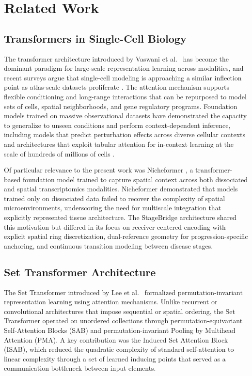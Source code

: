 \section{Related Work}

\subsection{Transformers in Single-Cell Biology}

The transformer architecture introduced by Vaswani et al.\ \cite{Vaswani2017-rb} has become the dominant paradigm for large-scale representation learning across modalities, and recent surveys argue that single-cell modeling is approaching a similar inflection point as atlas-scale datasets proliferate \cite{Szalata2024-jl}. The attention mechanism supports flexible conditioning and long-range interactions that can be repurposed to model sets of cells, spatial neighborhoods, and gene regulatory programs. Foundation models trained on massive observational datasets have demonstrated the capacity to generalize to unseen conditions and perform context-dependent inference, including models that predict perturbation effects across diverse cellular contexts \cite{Adduri2025-nt} and architectures that exploit tabular attention for in-context learning at the scale of hundreds of millions of cells \cite{Dong2026-fb}.

Of particular relevance to the present work was Nicheformer \cite{Tejada-Lapuerta2025-wz}, a transformer-based foundation model trained to capture spatial context across both dissociated and spatial transcriptomics modalities. Nicheformer demonstrated that models trained only on dissociated data failed to recover the complexity of spatial microenvironments, underscoring the need for multiscale integration that explicitly represented tissue architecture. The StageBridge architecture shared this motivation but differed in its focus on receiver-centered encoding with explicit spatial ring discretization, dual-reference geometry for progression-specific anchoring, and continuous transition modeling between disease stages.


\subsection{Set Transformer Architecture}

The Set Transformer introduced by Lee et al.\ \cite{Lee2018-ya} formalized permutation-invariant representation learning using attention mechanisms. Unlike recurrent or convolutional architectures that impose sequential or spatial ordering, the Set Transformer operated on unordered collections through permutation-equivariant Self-Attention Blocks (SAB) and permutation-invariant Pooling by Multihead Attention (PMA). A key contribution was the Induced Set Attention Block (ISAB), which reduced the quadratic complexity of standard self-attention to linear complexity through a set of learned inducing points that served as a communication bottleneck between input elements.

